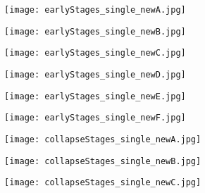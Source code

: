 \documentclass[3p,times,twocolumn]{elsarticle}
\begin{document}
\begin{figure*}
\begin{minipage}{2\columnwidth}
\centering
        \begin{subfigure}[b]{0.329\textwidth}
\texttt{[image: earlyStages\_single\_newA.jpg]}
        \end{subfigure}
        \begin{subfigure}[b]{0.329\textwidth}
\texttt{[image: earlyStages\_single\_newB.jpg]}
        \end{subfigure}
\begin{subfigure}[b]{0.329\textwidth}
\texttt{[image: earlyStages\_single\_newC.jpg]}
        \end{subfigure}
\end{minipage}
\begin{minipage}{2\columnwidth}
\centering        
\begin{subfigure}[b]{0.329\textwidth}
\texttt{[image: earlyStages\_single\_newD.jpg]}
        \end{subfigure}
        \begin{subfigure}[b]{0.329\textwidth}
\texttt{[image: earlyStages\_single\_newE.jpg]}
        \end{subfigure}
\begin{subfigure}[b]{0.329\textwidth}
\texttt{[image: earlyStages\_single\_newF.jpg]}
        \end{subfigure}
\end{minipage}
\begin{minipage}{2\columnwidth}
\centering
        \begin{subfigure}[b]{0.329\textwidth}
\texttt{[image: collapseStages\_single\_newA.jpg]}
        \end{subfigure}
        \begin{subfigure}[b]{0.329\textwidth}
\texttt{[image: collapseStages\_single\_newB.jpg]}
        \end{subfigure}
\begin{subfigure}[b]{0.329\textwidth}
\texttt{[image: collapseStages\_single\_newC.jpg]}
        \end{subfigure}
\end{minipage}
\caption{Mock-schlieren plots of the early stages in the collapse process
of a single cavity, induced by the impact of a  \SI{10.98}{\giga \pascal}
shock wave, at selected times. The plots
correspond to the $xz$-plane of the three-dimensional field, through the
centre of the cavity. Insets provide magnified regions of the graph, for
a clearer illustration of the weaker waves. Shocks are denoted as `S' and
rarefactions as `R'. The horizontal axis represents $x$  and the vertical
axis $z$, both in \SI{}{\micro \meter}.}
\label{early_single}
\end{figure*}
\end{document}
